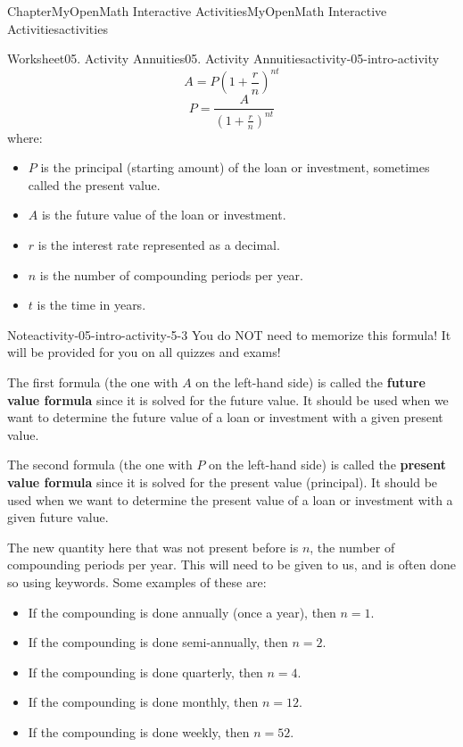 \documentclass[oneside,10pt,]{book}
\newcommand{\ptxlistdisc}{\raisebox{0.3ex}{\textbullet}}
\newcommand{\terminology}[1]{\textbf{#1}}
\begin{document}
\begin{chapterptx}{Chapter}{MyOpenMath Interactive Activities}{}{MyOpenMath Interactive Activities}{}{}{activities}
\begin{worksheet-section}{Worksheet}{05. Activity Annuities}{}{05. Activity Annuities}{}{}{activity-05-intro-activity}
\begin{equation*}
A = P\left(1 + \frac{r}{n}\right)^{nt}
\end{equation*}
%
\begin{equation*}
P = \frac{A}{\left(1 + \frac{r}{n}\right)^{nt}}
\end{equation*}
where:%
\begin{itemize}[label=\ptxlistdisc]
\item{}\(P\) is the principal (starting amount) of the loan or investment, sometimes called the present value.%
\item{}\(A\) is the future value of the loan or investment.%
\item{}\(r\) is the interest rate represented as a decimal.%
\item{}\(n\) is the number of compounding periods per year.%
\item{}\(t\) is the time in years.%
\end{itemize}
%
\begin{note}{Note}{}{activity-05-intro-activity-5-3}%
You do NOT need to memorize this formula! It will be provided for you on all quizzes and exams!%
\end{note}
The first formula (the one with \(A\) on the left-hand side) is called the \terminology{future value formula} since it is solved for the future value. It should be used when we want to determine the future value of a loan or investment with a given present value.%
\par
The second formula (the one with \(P\) on the left-hand side) is called the \terminology{present value formula} since it is solved for the present value (principal). It should be used when we want to determine the present value of a loan or investment with a given future value.%
\par
The new quantity here that was not present before is \(n\), the number of compounding periods per year. This will need to be given to us, and is often done so using keywords. Some examples of these are:%
\begin{itemize}[label=\ptxlistdisc]
\item{}If the compounding is done annually (once a year), then \(n = 1\).%
\item{}If the compounding is done semi-annually, then \(n = 2\).%
\item{}If the compounding is done quarterly, then \(n = 4\).%
\item{}If the compounding is done monthly, then \(n = 12\).%
\item{}If the compounding is done weekly, then \(n = 52\).%

\end{itemize}
\end{worksheet-section}
\end{chapterptx}
\end{document}
